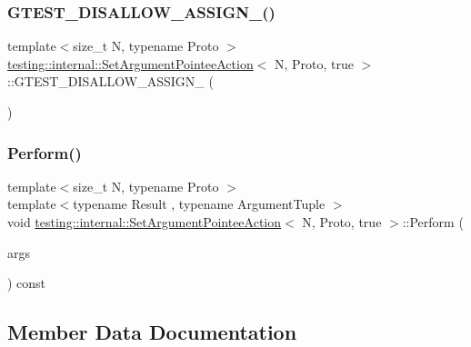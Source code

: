 \subsubsection{\texorpdfstring{GTEST\_DISALLOW\_ASSIGN\_()}{GTEST\_DISALLOW\_ASSIGN\_()}}
{\footnotesize\ttfamily template$<$size\+\_\+t N, typename Proto $>$ \\
\mbox{\hyperlink{structtesting_1_1internal_1_1_set_argument_pointee_action}{testing\+::internal\+::\+Set\+Argument\+Pointee\+Action}}$<$ N, Proto, true $>$\+::G\+T\+E\+S\+T\+\_\+\+D\+I\+S\+A\+L\+L\+O\+W\+\_\+\+A\+S\+S\+I\+G\+N\+\_\+ (\begin{DoxyParamCaption}\item[{\mbox{\hyperlink{structtesting_1_1internal_1_1_set_argument_pointee_action}{Set\+Argument\+Pointee\+Action}}$<$ N, Proto, true $>$}]{ }\end{DoxyParamCaption})\hspace{0.3cm}{\ttfamily [private]}}

\mbox{\label{classtesting_1_1internal_1_1_set_argument_pointee_action_3_01_n_00_01_proto_00_01true_01_4_ac89fa5dde5d2683206a77d29630917cd}} 
\subsubsection{\texorpdfstring{Perform()}{Perform()}}
{\footnotesize\ttfamily template$<$size\+\_\+t N, typename Proto $>$ \\
template$<$typename Result , typename Argument\+Tuple $>$ \\
void \mbox{\hyperlink{structtesting_1_1internal_1_1_set_argument_pointee_action}{testing\+::internal\+::\+Set\+Argument\+Pointee\+Action}}$<$ N, Proto, true $>$\+::Perform (\begin{DoxyParamCaption}\item[{const Argument\+Tuple \&}]{args }\end{DoxyParamCaption}) const\hspace{0.3cm}{\ttfamily [inline]}}



\subsection{Member Data Documentation}
\mbox{\label{classtesting_1_1internal_1_1_set_argument_pointee_action_3_01_n_00_01_proto_00_01true_01_4_aef9287aad8516bfec6cbcf63807c6c87}} 
